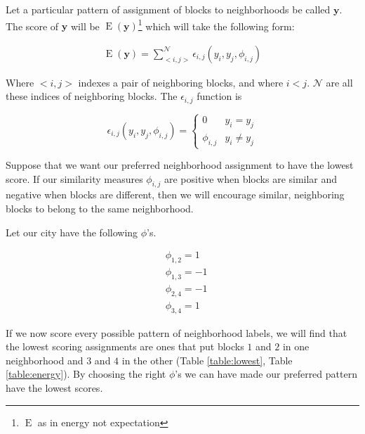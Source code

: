 Let a particular pattern of assignment of blocks to neighborhoods
be called $\mathbf{y}$.  The score of $\mathbf{y}$ will be
$\operatorname{E}(\mathbf{y})$\footnote{$\operatorname{E}$ as in
  energy not expectation} which will take the following form:

\begin{align}
\operatorname{E}(\mathbf{y}) = \sum_{<i,j>}^{\mathcal{N}}\epsilon_{i,j}(y_i,y_j,\phi_{i,j})
\end{align}

Where $<i,j>$ indexes a pair of neighboring blocks, and where $i < j$.
$\mathcal{N}$ are all these indices of neighboring blocks. The
$\epsilon_{i,j}$ function is 

\begin{equation}
\epsilon_{i,j}(y_i,y_j,\phi_{i,j}) = \begin{cases}
  0 &y_i = y_j \\
  \phi_{i,j} &y_i \neq y_j
\end{cases}
\end{equation}

Suppose that we want our preferred neighborhood assignment to have the
lowest score. If our similarity measures $\phi_{i,j}$ are positive
when blocks are similar and negative when blocks are different, then
we will encourage similar, neighboring blocks to belong to the same
neighborhood. 

Let our city have the following $\phi$'s.

\begin{align*}
&\phi_{1,2} = 1 \\
&\phi_{1,3} = -1 \\
&\phi_{2,4} = -1 \\
&\phi_{3,4} = 1
\end{align*} 

\noindent
If we now score every possible pattern of neighborhood labels, we will
find that the lowest scoring assignments are ones that put blocks $1$
and $2$ in one neighborhood and $3$ and $4$ in the other (Table
\ref{table:lowest}, Table \ref{table:energy}). By choosing the right
$\phi$'s we can have made our preferred pattern have the lowest scores.

